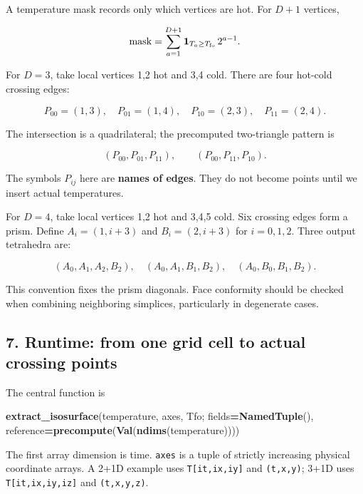 \documentclass[
  10pt,
]{article}
\newenvironment{Shaded}{\begin{snugshade}}{\end{snugshade}}
\newcommand{\FunctionTok}[1]{\textcolor[rgb]{0.13,0.29,0.53}{\textbf{#1}}}
\newcommand{\NormalTok}[1]{#1}
\newcommand{\OperatorTok}[1]{\textcolor[rgb]{0.81,0.36,0.00}{\textbf{#1}}}
\begin{document}
A temperature mask records only which vertices are hot. For \(D+1\)
vertices,

\[
\mathrm{mask}=\sum_{a=1}^{D+1}\mathbf1_{T_a\ge T_{\rm fo}}\,2^{a-1}.
\]

For \(D=3\), take local vertices 1,2 hot and 3,4 cold. There are four
hot-cold crossing edges:

\[
P_{00}=(1,3),\quad P_{01}=(1,4),\quad
P_{10}=(2,3),\quad P_{11}=(2,4).
\]

The intersection is a quadrilateral; the precomputed two-triangle
pattern is

\[
(P_{00},P_{01},P_{11}),\qquad(P_{00},P_{11},P_{10}).
\]

The symbols \(P_{ij}\) here are \textbf{names of edges}. They do not
become points until we insert actual temperatures.

For \(D=4\), take local vertices 1,2 hot and 3,4,5 cold. Six crossing
edges form a prism. Define \(A_i=(1,i+3)\) and \(B_i=(2,i+3)\) for
\(i=0,1,2\). Three output tetrahedra are:

\[
(A_0,A_1,A_2,B_2),\quad
(A_0,A_1,B_1,B_2),\quad
(A_0,B_0,B_1,B_2).
\]

This convention fixes the prism diagonals. Face conformity should be
checked when combining neighboring simplices, particularly in degenerate
cases.

\subsection{7. Runtime: from one grid cell to actual crossing
points}\label{runtime-from-one-grid-cell-to-actual-crossing-points}

The central function is

\begin{Shaded}
\begin{Highlighting}[]
\FunctionTok{extract\_isosurface}\NormalTok{(temperature, axes, Tfo;}
\NormalTok{    fields}\OperatorTok{=}\FunctionTok{NamedTuple}\NormalTok{(), reference}\OperatorTok{=}\FunctionTok{precompute}\NormalTok{(}\FunctionTok{Val}\NormalTok{(}\FunctionTok{ndims}\NormalTok{(temperature))))}
\end{Highlighting}
\end{Shaded}

The first array dimension is time. \texttt{axes} is a tuple of strictly
increasing physical coordinate arrays. A 2+1D example uses
\texttt{T{[}it,ix,iy{]}} and \texttt{(t,x,y)}; 3+1D uses
\texttt{T{[}it,ix,iy,iz{]}} and \texttt{(t,x,y,z)}.
\end{document}

